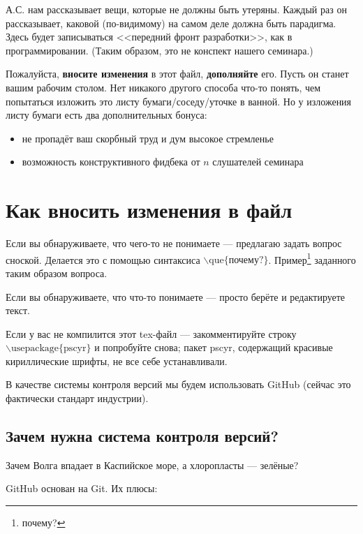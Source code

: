 \documentclass[11pt]{article}
\theoremstyle{remark}
\theoremstyle{definition}
\newcommand{\que}[1]{\footnote{\textcolor[rgb]{0.38,0.69,0.82}{#1}}}
\begin{document}
\baselineskip14pt
\bigskip


\tableofcontents
\bigskip
\bigskip


А.С. нам рассказывает вещи, которые не должны быть утеряны. Каждый раз он рассказывает, каковой (по-видимому) на самом деле должна быть парадигма. Здесь будет записываться <<передний фронт разработки>>, как в программировании. (Таким образом, это не конспект нашего семинара.)

Пожалуйста, \textbf{вносите изменения} в этот файл, \textbf{дополняйте} его. Пусть он станет вашим рабочим столом. Нет никакого другого способа что-то понять, чем попытаться изложить это листу бумаги/соседу/уточке в ванной. Но у изложения листу бумаги есть два дополнительных бонуса:
\begin{itemize}
  \item не пропадёт ваш скорбный труд и дум высокое стремленье
  \item возможность конструктивного фидбека от $n$ слушателей семинара
\end{itemize}

\section{Как вносить изменения в файл}

Если вы обнаруживаете, что чего-то не понимаете --- предлагаю задать вопрос сноской. Делается это с помощью синтаксиса $\backslash \text{que} \{ \text{почему?} \}$. Пример\que{почему?} заданного таким образом вопроса.

Если вы обнаруживаете, что что-то понимаете --- просто берёте и редактируете текст.

Если у вас не компилится этот tex-файл --- закомментируйте строку $\backslash\text{usepackage}\{ \text{pscyr} \}$ и попробуйте снова; пакет pscyr, содержащий красивые кириллические шрифты, не все себе устанавливали.

В качестве системы контроля версий мы будем использовать GitHub (сейчас это фактически стандарт индустрии).

\subsection{Зачем нужна система контроля версий?}

Зачем Волга впадает в Каспийское море, а хлоропласты --- зелёные?

GitHub основан на Git. Их плюсы:
\end{document}
